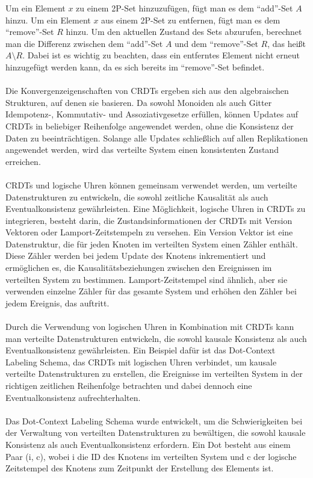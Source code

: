 \documentclass[../vs-script-first-v01.tex]{subfiles}
\begin{document}
Um ein Element $x$ zu einem 2P-Set hinzuzufügen, fügt man es dem \enquote{add}-Set $A$ hinzu. Um ein Element $x$ aus einem 2P-Set zu entfernen, fügt man es dem \enquote{remove}-Set $R$ hinzu. Um den aktuellen Zustand des Sets abzurufen, berechnet man die Differenz zwischen dem \enquote{add}-Set $A$ und dem \enquote{remove}-Set $R$, das heißt $A \setminus R$. Dabei ist es wichtig zu beachten, dass ein entferntes Element nicht erneut hinzugefügt werden kann, da es sich bereits im \enquote{remove}-Set befindet.
\\\\
Die Konvergenzeigenschaften von CRDTs ergeben sich aus den algebraischen Strukturen, auf denen sie basieren. Da sowohl Monoiden als auch Gitter Idempotenz-, Kommutativ- und Assoziativgesetze erfüllen, können Updates auf CRDTs in beliebiger Reihenfolge angewendet werden, ohne die Konsistenz der Daten zu beeinträchtigen. Solange alle Updates schließlich auf allen Replikationen angewendet werden, wird das verteilte System einen konsistenten Zustand erreichen.
\\\\
CRDTs und logische Uhren können gemeinsam verwendet werden, um verteilte Datenstrukturen zu entwickeln, die sowohl zeitliche Kausalität als auch Eventualkonsistenz gewährleisten. Eine Möglichkeit, logische Uhren in CRDTs zu integrieren, besteht darin, die Zustandsinformationen der CRDTs mit Version Vektoren oder Lamport-Zeitstempeln zu versehen.
Ein Version Vektor ist eine Datenstruktur, die für jeden Knoten im verteilten System einen Zähler enthält. Diese Zähler werden bei jedem Update des Knotens inkrementiert und ermöglichen es, die Kausalitätsbeziehungen zwischen den Ereignissen im verteilten System zu bestimmen. Lamport-Zeitstempel sind ähnlich, aber sie verwenden einzelne Zähler für das gesamte System und erhöhen den Zähler bei jedem Ereignis, das auftritt.
\\\\
Durch die Verwendung von logischen Uhren in Kombination mit CRDTs kann man verteilte Datenstrukturen entwickeln, die sowohl kausale Konsistenz als auch Eventualkonsistenz gewährleisten. Ein Beispiel dafür ist das Dot-Context Labeling Schema, das CRDTs mit logischen Uhren verbindet, um kausale verteilte Datenstrukturen zu erstellen, die Ereignisse im verteilten System in der richtigen zeitlichen Reihenfolge betrachten und dabei dennoch eine Eventualkonsistenz aufrechterhalten.
\\\\
Das Dot-Context Labeling Schema wurde entwickelt, um die Schwierigkeiten bei der Verwaltung von verteilten Datenstrukturen zu bewältigen, die sowohl kausale Konsistenz als auch Eventualkonsistenz erfordern. Ein Dot besteht aus einem Paar (i, c), wobei i die ID des Knotens im verteilten System und c der logische Zeitstempel des Knotens zum Zeitpunkt der Erstellung des Elements ist.
\end{document}
